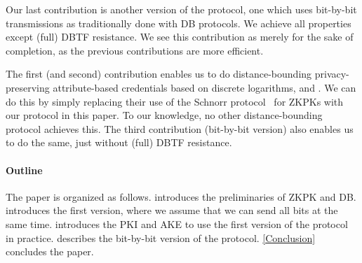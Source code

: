 Our last contribution is another version of the protocol, one which uses 
bit-by-bit transmissions as traditionally done with \ac{DB} protocols.
We achieve all properties except (full) \ac{DBTF} resistance.
We see this contribution as merely for the sake of completion, as the previous 
contributions are more efficient.

The first (and second) contribution enables us to do distance-bounding 
privacy-preserving attribute-based credentials based on discrete logarithms, 
\eg \cite{Camenisch-phdthesis} and \cite{CLsignatures}.
We can do this by simply replacing their use of the Schnorr 
protocol~\cite{Schnorr} for \acp{ZKPK} with our protocol in this paper.
To our knowledge, no other distance-bounding protocol achieves this.
The third contribution (bit-by-bit version) also enables us to do the same, 
just without (full) \ac{DBTF} resistance. %

\paragraph*{Outline}

The paper is organized as follows.
 introduces the preliminaries of \ac{ZKPK} and \ac{DB}.
 introduces the first version, where we assume that we can 
send all bits at the same time.
 introduces the \ac{PKI} and \ac{AKE} to use the first 
version of the protocol in practice.
 describes the bit-by-bit version of the protocol.
\cref{Conclusion} concludes the paper.
